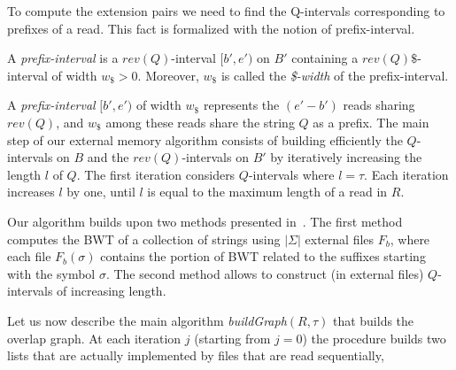 \documentclass[runningheads,envcountsame,a4paper]{llncs}
\newcommand{\notaestesa}[2]{%
 \marginpar{\color{red!75!black}\textbf{\texttimes}}%
 {\color{red!75!black}%
 [\,\textbullet\,\textsf{\textbf{#1:}} %
 \textsf{\footnotesize#2}\,\textbullet\,]}%
}
\begin{document}
To compute the extension pairs we need to find the Q-intervals  corresponding to prefixes of a read.
This fact is formalized with the notion of prefix-interval.

\begin{definition}
A \emph{prefix-interval} is a $rev(Q)$-interval $[b',e')$ on $B'$ containing
a $rev(Q)\$$-interval of width $w_{\$}>0$.
Moreover, $w_{\$}$ is called the \emph{\$-width}
of the prefix-interval.
\end{definition}

A \emph{prefix-interval} $[b',e')$ of width $w_{\$}$ represents the $(e'-b')$
reads sharing $rev(Q)$, and $w_{\$}$ among these reads share the string $Q$ as a
prefix.
%
The main step of our external memory algorithm consists of  building efficiently
the $Q$-intervals on $B$ and the $rev(Q)$-intervals on
$B'$ by iteratively increasing the length $l$ of $Q$.
The first iteration considers $Q$-intervals where $l=\tau$.
Each iteration increases $l$ by one, until $l$ is equal to the maximum length
of a read in $R$.


Our algorithm builds upon two methods presented in~\cite{Bauer2011,Cox2012}.
The first method computes the BWT of a collection of strings using $|\Sigma|$
external files $F_b$, where each file $F_b(\sigma)$ contains the portion of BWT related to the suffixes
starting with the symbol $\sigma$.
The second method allows to construct (in external files) $Q$-intervals
of increasing length.%

\begin{comment}
In particular, the procedure \emph{processInterval} given
in~\cite{Cox2012} is used in our algorithm to produce the sorted list
(lexicographical order) of the intervals of a given length $l$, from the
sorted list of the intervals of length $l-1$ (intervals of length $1$
can be easily obtained by means of the FM-index function $C$).
\notaestesa{Raffa}{Togliere lo pseudocodice della procedura processInterval: \'e della Rosone e non nostro.}.
\notaestesa{GDV}{ Concordo di togliere lo pseudocodice.
Bisogna dire però cosa calcola la procedura}

We extend the procedure \emph{processInterval} to
\emph{processLinkedInterval}, where we produce not only the $Q$-intervals on $B$, but also the linked
$rev(Q)$-intervals on $B'$.
\end{comment}



Let us now describe the main algorithm  \emph{buildGraph$(R, \tau)$} that
builds the overlap graph.
At each iteration $j$ (starting from $j=0$) the procedure builds  two  lists
that are actually implemented by files that are read sequentially,
\end{document}
